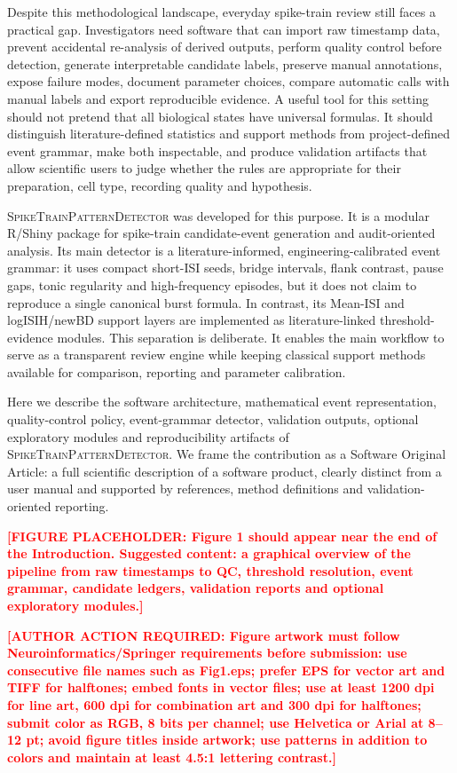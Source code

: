 \documentclass[pdflatex,sn-apa]{sn-jnl}
\newcommand{\stpd}{\textsc{SpikeTrainPatternDetector}}
\newcommand{\TODOFIG}[1]{\par\medskip\noindent\textbf{\textcolor{red}{[FIGURE PLACEHOLDER: #1]}}\par\medskip}
\newcommand{\TODONOTE}[1]{\par\medskip\noindent\textbf{\textcolor{red}{[AUTHOR ACTION REQUIRED: #1]}}\par\medskip}
\begin{document}
Despite this methodological landscape, everyday spike-train review still faces a practical gap. Investigators need software that can import raw timestamp data, prevent accidental re-analysis of derived outputs, perform quality control before detection, generate interpretable candidate labels, preserve manual annotations, expose failure modes, document parameter choices, compare automatic calls with manual labels and export reproducible evidence. A useful tool for this setting should not pretend that all biological states have universal formulas. It should distinguish literature-defined statistics and support methods from project-defined event grammar, make both inspectable, and produce validation artifacts that allow scientific users to judge whether the rules are appropriate for their preparation, cell type, recording quality and hypothesis.

\stpd{} was developed for this purpose. It is a modular R/Shiny package for spike-train candidate-event generation and audit-oriented analysis. Its main detector is a literature-informed, engineering-calibrated event grammar: it uses compact short-ISI seeds, bridge intervals, flank contrast, pause gaps, tonic regularity and high-frequency episodes, but it does not claim to reproduce a single canonical burst formula. In contrast, its Mean-ISI and logISIH/newBD support layers are implemented as literature-linked threshold-evidence modules. This separation is deliberate. It enables the main workflow to serve as a transparent review engine while keeping classical support methods available for comparison, reporting and parameter calibration.

Here we describe the software architecture, mathematical event representation, quality-control policy, event-grammar detector, validation outputs, optional exploratory modules and reproducibility artifacts of \stpd. We frame the contribution as a Software Original Article: a full scientific description of a software product, clearly distinct from a user manual and supported by references, method definitions and validation-oriented reporting.

\TODOFIG{Figure 1 should appear near the end of the Introduction. Suggested content: a graphical overview of the pipeline from raw timestamps to QC, threshold resolution, event grammar, candidate ledgers, validation reports and optional exploratory modules.}

\TODONOTE{Figure artwork must follow Neuroinformatics/Springer requirements before submission: use consecutive file names such as Fig1.eps; prefer EPS for vector art and TIFF for halftones; embed fonts in vector files; use at least 1200 dpi for line art, 600 dpi for combination art and 300 dpi for halftones; submit color as RGB, 8 bits per channel; use Helvetica or Arial at 8--12 pt; avoid figure titles inside artwork; use patterns in addition to colors and maintain at least 4.5:1 lettering contrast.}
\end{document}
